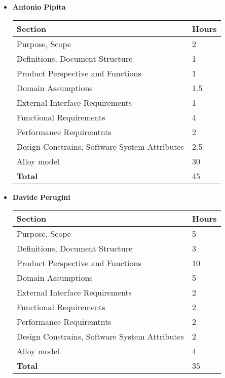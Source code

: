 \begin{itemize}
\item \textbf{Antonio Pipita}

\begin{table}[!h]
\centering
\begin{tabular}{|l|l|}
\hline
\textbf{Section}														&		\textbf{Hours}  \\ \hline
Purpose, Scope														&  2	\\ \hline
Definitions, Document Structure							& 1  	\\ \hline
Product Perspective and Functions						& 1 	\\ \hline
Domain Assumptions												&  1.5	\\ \hline
External Interface Requirements							& 1 	\\ \hline
Functional Requirements										&  4	\\ \hline
Performance Requiremtnts									&  2	\\ \hline
Design Constrains, Software System Attributes	& 2.5 	\\ \hline
Alloy model   &  30     \\ \hline
\textbf{Total}															&  	45\\ \hline
\end{tabular}
\end{table}

\item \textbf{Davide Perugini}

\begin{table}[!h]
	\centering
\begin{tabular}{|l|l|}
\hline
\textbf{Section}														&		\textbf{Hours}  \\ \hline
Purpose, Scope														&  	5\\ \hline
Definitions, Document Structure							&  	3\\ \hline
Product Perspective and Functions						&  	10\\ \hline
Domain Assumptions												&  	5\\ \hline 
External Interface Requirements							&  	2\\ \hline
Functional Requirements										&  2	\\ \hline
Performance Requiremtnts									& 2	\\ \hline
Design Constrains, Software System Attributes	&  2	\\ \hline
Alloy model   &      4 \\ \hline
\textbf{Total}															&  35	\\ \hline
\end{tabular}
\end{table}


\end{itemize}
